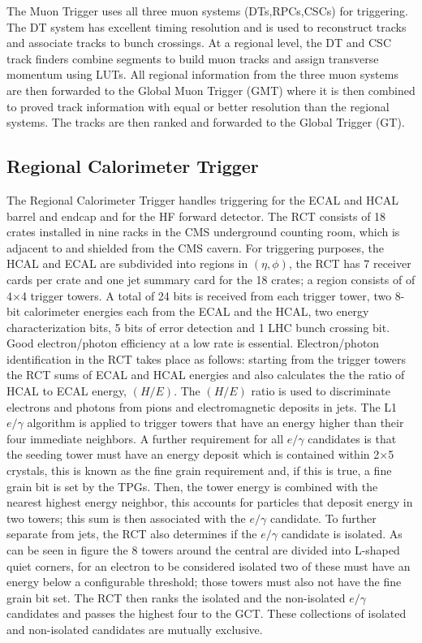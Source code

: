 The Muon Trigger uses all three muon systems (DTs,RPCs,CSCs) for triggering.
The DT system has excellent timing resolution and is used to reconstruct tracks
and associate tracks to bunch crossings. At a regional level, the DT and CSC track finders
combine segments to build muon tracks and assign transverse momentum using
LUTs. All regional information from the three muon systems are then forwarded
to the Global Muon Trigger (GMT) where it is then combined to proved track
information with equal or better resolution than the regional systems. The tracks
are then ranked and forwarded to the Global Trigger (GT).
  \subsection{Regional Calorimeter Trigger}
The Regional Calorimeter Trigger handles triggering for the %
ECAL and HCAL barrel and 
endcap and for the HF forward detector.
The RCT consists of 18 crates installed in nine racks
in the CMS underground counting room, which is 
adjacent to and shielded from the CMS cavern.
For triggering purposes, the HCAL and ECAL are subdivided into regions  in 
$(\eta,\phi)$, the RCT has 7 receiver cards per crate and one jet summary card
for the 18 crates; a region consists of of 4$\times$4 trigger towers. 
A total of 24 bits is received from each trigger tower, 
two 8-bit calorimeter energies each from the ECAL and the HCAL,
two energy characterization bits, 5 bits of error detection and 1 LHC bunch crossing bit.
Good electron/photon efficiency at a low rate is essential. Electron/photon
identification in the RCT takes place as follows: starting from the trigger towers
the RCT sums of ECAL and HCAL energies and also calculates the
the ratio of HCAL to ECAL energy, $(H/E)$. The $(H/E)$ ratio is used to
discriminate electrons and photons from pions and electromagnetic deposits
in jets. 
The L1 $e/\gamma$ algorithm is applied to trigger towers that have an energy%
higher than their four immediate neighbors.
A further requirement for all $e/\gamma$ candidates
is that the seeding tower must have an energy deposit which is contained within 
2$\times$5 crystals, this is known as the fine grain requirement and, if this is true,
a fine grain bit is set by the TPGs. 
Then, the tower energy is combined with the nearest highest energy neighbor,
this accounts for particles that deposit energy in two towers; this sum is then
associated with the $e/\gamma$ candidate.
To further separate from jets, the RCT also determines if the $e/\gamma$ candidate
is isolated. As can be seen in figure %
the 8 towers around the central are divided into L-shaped quiet corners,
for an electron to be considered isolated two of these must have an energy
below a configurable threshold; those towers must also not have the fine grain
bit set.
The RCT then ranks the isolated and the non-isolated $e/\gamma$ candidates
and passes the highest four to the GCT. These collections of isolated and non-isolated
candidates are mutually exclusive.


